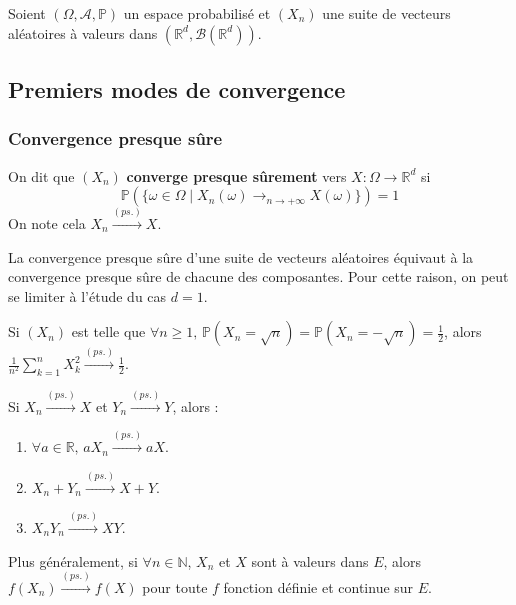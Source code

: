 




  Soient $(\Omega, \mathcal{A}, \mathbb{P})$ un espace probabilisé et $(X_n)$ une suite de vecteurs aléatoires à valeurs dans $(\mathbb{R}^d, \mathcal{B}(\mathbb{R}^d))$.

  \subsection{Premiers modes de convergence}

  \subsubsection{Convergence presque sûre}


  \begin{definition}
    On dit que $(X_n)$ \textbf{converge presque sûrement} vers $X : \Omega \rightarrow \mathbb{R}^d$ si
    \[ \mathbb{P}(\{ \omega \in \Omega \mid X_n(\omega) \longrightarrow_{n \rightarrow +\infty} X(\omega) \}) = 1 \]
    On note cela $X_n \overset{(ps.)}{\longrightarrow} X$.
  \end{definition}

  \begin{remark}
    La convergence presque sûre d'une suite de vecteurs aléatoires équivaut à la convergence presque sûre de chacune des composantes. Pour cette raison, on peut se limiter à l'étude du cas $d = 1$.
  \end{remark}


  \begin{example}
    Si $(X_n)$ est telle que $\forall n \geq 1, \, \mathbb{P}(X_n = \sqrt{n})=\mathbb{P}(X_n=-\sqrt{n}) = \frac{1}{2}$, alors $\frac{1}{n^2} \sum_{k=1}^n X_k^2 \overset{(ps.)}{\longrightarrow} \frac{1}{2}$.
  \end{example}


  \begin{proposition}
    Si $X_n \overset{(ps.)}{\longrightarrow} X$ et $Y_n \overset{(ps.)}{\longrightarrow} Y$, alors :
    \begin{enumerate}[label={\bfseries(\roman*)}]
      \item $\forall a \in \mathbb{R}, \, aX_n \overset{(ps.)}{\longrightarrow} aX$.
      \item $X_n + Y_n \overset{(ps.)}{\longrightarrow} X + Y$.
      \item $X_nY_n \overset{(ps.)}{\longrightarrow} XY$.
    \end{enumerate}
    Plus généralement, si $\forall n \in \mathbb{N}$, $X_n$ et $X$ sont à valeurs dans $E$, alors $f(X_n) \overset{(ps.)}{\longrightarrow} f(X)$ pour toute $f$ fonction définie et continue sur $E$.
  \end{proposition}

